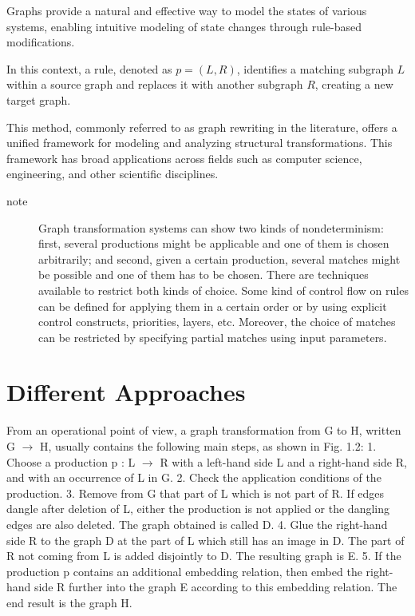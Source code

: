 Graphs provide a natural and effective way to model the states of various systems, enabling intuitive modeling of state changes through rule-based modifications. 

In this context, a rule, denoted as \(p \mathop{=} (L, R)\), identifies a matching subgraph \(L\) within a source graph and replaces it with another subgraph \(R\), creating a new target graph. 

This method, commonly referred to as graph rewriting in the literature, offers a unified framework for modeling and analyzing structural transformations. This framework has broad applications across fields such as computer science, engineering, and other scientific disciplines.

\begin{description}
    \item[note]Graph transformation systems can show two kinds of nondeterminism: first, several productions might be applicable and one of them is chosen arbitrarily; and second, given a certain production, several matches might be possible and one of them has to be chosen. There are techniques available to restrict both kinds of choice. Some kind of control flow on rules can be defined for applying them in a certain order or by using explicit control constructs, priorities, layers, etc. Moreover, the choice of matches can be restricted by specifying partial matches using input parameters.
\end{description}

 
\section{Different Approaches}

From an operational point of view, a graph transformation from G to H, written G $\to$ H, usually contains the following main steps, as shown in Fig. 1.2: 1. Choose a production p : L $\to$ R with a left-hand side L and a right-hand side R, and with an occurrence of L in G. 2. Check the application conditions of the production. 3. Remove from G that part of L which is not part of R. If edges dangle after deletion of L, either the production is not applied or the dangling edges are also deleted. The graph obtained is called D. 4. Glue the right-hand side R to the graph D at the part of L which still has an image in D. The part of R not coming from L is added disjointly to D. The resulting graph is E. 5. If the production p contains an additional embedding relation, then embed the right-hand side R further into the graph E according to this embedding relation. The end result is the graph H.

